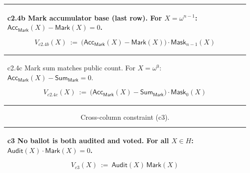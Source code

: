 \begin{table}[t]
\begin{tabular}{@{}p{0.98\linewidth}@{}}
c2.4b Mark accumulator base (last row). For $X=\omega^{n-1}$:
$\mathsf{Acc}_{\mathsf{Mark}}(X)-\mathsf{Mark}(X)=0$.
\begin{mdframed}[linewidth=0.6pt,backgroundcolor=verylightpink,innerleftmargin=6pt,innerrightmargin=6pt,innertopmargin=4pt,innerbottommargin=4pt]
\[
V_{c2.4b}(X)\ :=\ \bigl(\mathsf{Acc}_{\mathsf{Mark}}(X)-\mathsf{Mark}(X)\bigr)\cdot \mathsf{Mask}_{n-1}(X)
\]
\end{mdframed}
\\[-2mm]
\midrule

c2.4c Mark sum matches public count. For $X=\omega^0$:
$\mathsf{Acc}_{\mathsf{Mark}}(X)-\mathsf{Sum}_{\mathsf{Mark}}=0$.
\begin{mdframed}[linewidth=0.6pt,backgroundcolor=verylightpink,innerleftmargin=6pt,innerrightmargin=6pt,innertopmargin=4pt,innerbottommargin=4pt]
\[
V_{c2.4c}(X)\ :=\ \bigl(\mathsf{Acc}_{\mathsf{Mark}}(X)-\mathsf{Sum}_{\mathsf{Mark}}\bigr)\cdot \mathsf{Mask}_{0}(X)
\]
\end{mdframed}
\\[-2mm]

\bottomrule
\end{tabular}
\end{table}

\begin{table}[t]
\small
\setlength{\tabcolsep}{3pt}
\renewcommand{\arraystretch}{1.05}
\caption{Cross-column constraint (c3).}
\label{tab:constraints-cross}
\begin{tabular}{@{}p{0.98\linewidth}@{}}
\toprule

c3 No ballot is both audited and voted. For all $X\in H$: $\mathsf{Audit}(X)\cdot \mathsf{Mark}(X)=0$.
\begin{mdframed}[linewidth=0.6pt,backgroundcolor=verylightpink,innerleftmargin=6pt,innerrightmargin=6pt,innertopmargin=4pt,innerbottommargin=4pt]
\[
V_{c3}(X)\ :=\ \mathsf{Audit}(X)\,\mathsf{Mark}(X)
\]
\end{mdframed}
\\[-2mm]

\bottomrule
\end{tabular}
\end{table}

